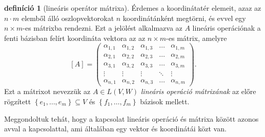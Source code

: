 \documentclass[9pt, showtrims]{memoir}
\theoremstyle{plain}
\theoremstyle{remark}
\theoremstyle{definition}
\newtheorem{definition}[proposition]{definíció}
\begin{document}
\begin{definition}[lineáris operátor mátrixa]
    Érdemes a koordinátatér elemeit, azaz az $n\cdot m$ elemből álló oszlopvektorokat $n$ koordinátánként megtörni,
    és evvel egy $n\times m$-es mátrixba rendezni.
    Ezt a jelölést alkalmazva az $A$ lineáris operációnak a fenti bázisban felírt koordináta vektora az az 
    $n\times m$-es mátrix,
    amelyre
    \[
    [A]=
    \begin{pmatrix}
        \alpha_{1,1}&\alpha_{1,2}&\alpha_{1,3}&\dots&\alpha_{1,m}\\
        \alpha_{2,1}&\alpha_{2,2}&\alpha_{2,3}&\dots&\alpha_{2,m}\\
        \alpha_{3,1}&\alpha_{3,2}&\alpha_{3,3}&\dots&\alpha_{3,m}\\
        \vdots      &\vdots      &\vdots      &\ddots&\vdots\\
        \alpha_{n,1}&\alpha_{n,2}&\alpha_{n,3}&\dots&\alpha_{n,m}
    \end{pmatrix}.
    \]
    Ezt a mátrixot nevezzük az 
    $A\in L\left( V,W \right)$ \emph{lineáris operáció mátrixának}
    az előre rögzített 
    $\left\{e_1,\dots,e_m  \right\}\subseteq V$ és $\left\{ f_1,\dots,f_m \right\}$ bázisok mellett.
\end{definition}
Meggondoltuk tehát, hogy a kapcsolat lineáris operáció és mátrixa között azonos avval a kapcsolattal,
ami általában egy vektor és koordinátái közt van.
\end{document}
